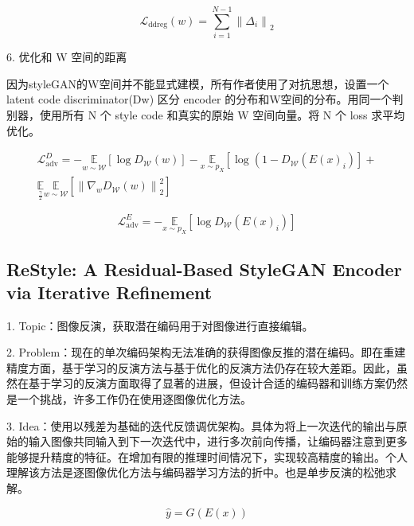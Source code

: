 \begin{equation}
\mathcal{L}_{\mathrm{d} \mathrm{dreg}}(w)=\sum_{i=1}^{N-1}\left\|\Delta_{i}\right\|_{2}
\end{equation}

6. 优化和 W 空间的距离

因为styleGAN的W空间并不能显式建模，所有作者使用了对抗思想，设置一个 latent code discriminator(Dw) 区分 encoder 的分布和W空间的分布。用同一个判别器，使用所有 N 个 style code 和真实的原始 W 空间向量。将 N 个 loss 求平均优化。

\begin{equation}
\begin{gathered}
\mathcal{L}_{\mathrm{adv}}^{D}=-\underset{w \sim \mathcal{W}}{\mathbb{E}}\left[\log D_{\mathcal{W}}(w)\right]-\underset{x \sim p_{X}}{\mathbb{E}}\left[\log \left(1-D_{\mathcal{W}}\left(E(x)_{i}\right)\right]+\right. \\
\underset{\frac{\gamma}{2}}{\mathbb{E}} \underset{w \sim \mathcal{W}}{\mathbb{E}}\left[\left\|\nabla_{w} D_{\mathcal{W}}(w)\right\|_{2}^{2}\right]
\end{gathered}
\end{equation}

\begin{equation}
\mathcal{L}_{\mathrm{adv}}^{E}=-\underset{x \sim p_{X}}{\mathbb{E}}\left[\log D_{\mathcal{W}}\left(E(x)_{i}\right)\right]
\end{equation}

\subsection{ReStyle: A Residual-Based StyleGAN Encoder via Iterative Reﬁnement}

1. Topic：图像反演，获取潜在编码用于对图像进行直接编辑。

2. Problem：现在的单次编码架构无法准确的获得图像反推的潜在编码。即在重建精度方面，基于学习的反演方法与基于优化的反演方法仍存在较大差距。因此，虽然在基于学习的反演方面取得了显著的进展，但设计合适的编码器和训练方案仍然是一个挑战，许多工作仍在使用逐图像优化方法。

3. Idea：使用以残差为基础的迭代反馈调优架构。具体为将上一次迭代的输出与原始的输入图像共同输入到下一次迭代中，进行多次前向传播，让编码器注意到更多能够提升精度的特征。在增加有限的推理时间情况下，实现较高精度的输出。个人理解该方法是逐图像优化方法与编码器学习方法的折中。也是单步反演的松弛求解。

\begin{equation}
\hat{y}=G(E(x))
\end{equation}

